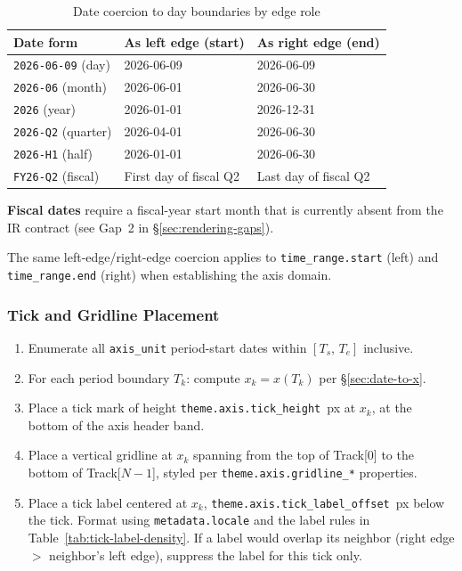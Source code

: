 \begin{table}[h]
\centering
\small
\begin{tabular}{lll}
\toprule
\textbf{Date form} & \textbf{As left edge (start)} & \textbf{As right edge (end)} \\
\midrule
\texttt{2026-06-09}  (day)    & 2026-06-09 & 2026-06-09 \\
\texttt{2026-06}     (month)  & 2026-06-01 & 2026-06-30 \\
\texttt{2026}        (year)   & 2026-01-01 & 2026-12-31 \\
\texttt{2026-Q2}     (quarter)& 2026-04-01 & 2026-06-30 \\
\texttt{2026-H1}     (half)   & 2026-01-01 & 2026-06-30 \\
\texttt{FY26-Q2}     (fiscal) & First day of fiscal Q2 & Last day of fiscal Q2 \\
\bottomrule
\end{tabular}
\caption{Date coercion to day boundaries by edge role}
\label{tab:date-coercion}
\end{table}

\textbf{Fiscal dates} require a fiscal-year start month that is currently absent from the IR
contract (see Gap~2 in \S\ref{sec:rendering-gaps}).

The same left-edge/right-edge coercion applies to \texttt{time\_range.start} (left) and
\texttt{time\_range.end} (right) when establishing the axis domain.

\subsubsection{Tick and Gridline Placement}
\label{sec:tick-placement}

\begin{enumerate}
  \item Enumerate all \texttt{axis\_unit} period-start dates within $[T_s,\,T_e]$ inclusive.
  \item For each period boundary $T_k$: compute $x_k = x(T_k)$ per \S\ref{sec:date-to-x}.
  \item Place a tick mark of height \texttt{theme.axis.tick\_height}~px at $x_k$, at the
        bottom of the axis header band.
  \item Place a vertical gridline at $x_k$ spanning from the top of Track[0] to the bottom
        of Track[$N-1$], styled per \texttt{theme.axis.gridline\_*} properties.
  \item Place a tick label centered at $x_k$, \texttt{theme.axis.tick\_label\_offset}~px
        below the tick. Format using \texttt{metadata.locale} and the label rules in
        Table~\ref{tab:tick-label-density}. If a label would overlap its neighbor (right
        edge $>$ neighbor's left edge), suppress the label for this tick only.
\end{enumerate}

